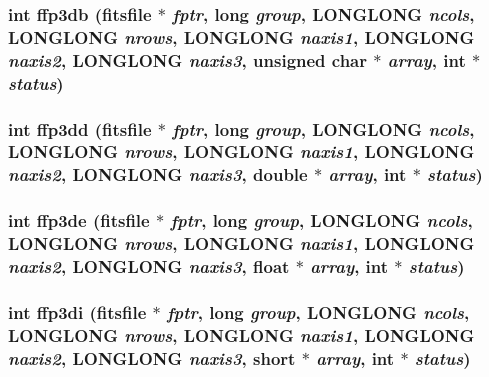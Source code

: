\subsubsection{\setlength{\rightskip}{0pt plus 5cm}int ffp3db (\bf{fitsfile} $\ast$ {\em fptr}, long {\em group}, \bf{LONGLONG} {\em ncols}, \bf{LONGLONG} {\em nrows}, \bf{LONGLONG} {\em naxis1}, \bf{LONGLONG} {\em naxis2}, \bf{LONGLONG} {\em naxis3}, unsigned char $\ast$ {\em array}, int $\ast$ {\em status})}\label{test_2roimasker_2fitsio_8h_509db23e215c4ac2df334edd78851e1e}


\subsubsection{\setlength{\rightskip}{0pt plus 5cm}int ffp3dd (\bf{fitsfile} $\ast$ {\em fptr}, long {\em group}, \bf{LONGLONG} {\em ncols}, \bf{LONGLONG} {\em nrows}, \bf{LONGLONG} {\em naxis1}, \bf{LONGLONG} {\em naxis2}, \bf{LONGLONG} {\em naxis3}, double $\ast$ {\em array}, int $\ast$ {\em status})}\label{test_2roimasker_2fitsio_8h_07253c7bb04c4b09022517aff697976b}


\subsubsection{\setlength{\rightskip}{0pt plus 5cm}int ffp3de (\bf{fitsfile} $\ast$ {\em fptr}, long {\em group}, \bf{LONGLONG} {\em ncols}, \bf{LONGLONG} {\em nrows}, \bf{LONGLONG} {\em naxis1}, \bf{LONGLONG} {\em naxis2}, \bf{LONGLONG} {\em naxis3}, float $\ast$ {\em array}, int $\ast$ {\em status})}\label{test_2roimasker_2fitsio_8h_47bab14919cfc2b7d34df2117c7dfdaa}


\subsubsection{\setlength{\rightskip}{0pt plus 5cm}int ffp3di (\bf{fitsfile} $\ast$ {\em fptr}, long {\em group}, \bf{LONGLONG} {\em ncols}, \bf{LONGLONG} {\em nrows}, \bf{LONGLONG} {\em naxis1}, \bf{LONGLONG} {\em naxis2}, \bf{LONGLONG} {\em naxis3}, short $\ast$ {\em array}, int $\ast$ {\em status})}\label{test_2roimasker_2fitsio_8h_61b77356b3271c147b6d8cef61a762ab}


